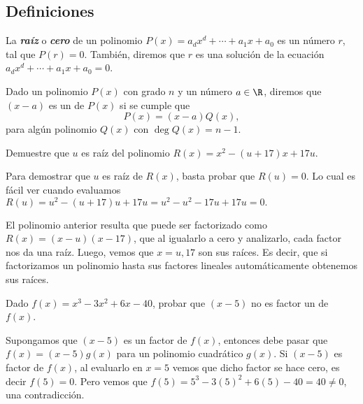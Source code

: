 \subsection{Definiciones}

\begin{definition}
    La \textbf{\emph{raíz}} o \textbf{\emph{cero}} de un polinomio $P(x) = a_d x^d + \cdots + a_1 x + a_0$ es un número $r$, tal que $P(r) = 0$.
    También, diremos que $r$ es una solución de la ecuación $ a_d x^d + \cdots + a_1 x + a_0 = 0$.
\end{definition}

\begin{definition}
    Dado un polinomio $P(x)$ con grado $n$ y un número $a \in \R$, diremos que $(x - a)$ es un  de $P(x)$ si se cumple que
    \[
        P(x) = (x - a)Q(x),
    \]
    para algún polinomio $Q(x)$ con $\deg Q(x) = n - 1$.
\end{definition}

\begin{example}
    Demuestre que $u$ es raíz del polinomio $R(x) = x^2 - (u + 17) x + 17u$.
\end{example}
\begin{solution}
    Para demostrar que $u$ es raíz de $R(x)$, basta probar que $R(u) = 0$.
    Lo cual es fácil ver cuando evaluamos $R(u) = u^2 - (u+17)u + 17u = u^2 - u^2 - 17u + 17u = 0.$
\end{solution}

El polinomio anterior resulta que puede ser factorizado como $R(x) = (x - u)(x - 17)$, que al igualarlo a cero y analizarlo, cada factor nos da una raíz.
Luego, vemos que $x = u, 17$ son sus raíces.
Es decir, que si factorizamos un polinomio hasta sus factores lineales automáticamente obtenemos sus raíces.

\begin{example}
    Dado $f(x) = x^3 - 3x^2 + 6x - 40$, probar que $(x - 5)$ no es factor un de $f(x)$.
\end{example}
\begin{solution}
    Supongamos que $(x - 5)$ es un factor de $f(x)$, entonces debe pasar que $f(x) = (x - 5)g(x)$ para un polinomio cuadrático $g(x)$.
    Si $(x - 5)$ es factor de $f(x)$, al evaluarlo en $x = 5$ vemos que dicho factor se hace cero, es decir $f(5) = 0$.
    Pero vemos que $f(5) = 5^3 - 3(5)^2 + 6(5) - 40 = 40 \neq 0$, una contradicción.
\end{solution}


